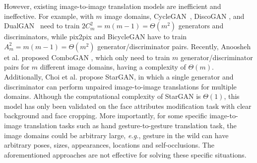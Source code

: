 \documentclass[sigconf]{acmart}
\begin{document}
However, existing image-to-image translation models are inefficient and ineffective.
For example, with $m$ image domains, CycleGAN~\cite{zhu2017unpaired}, DiscoGAN \cite{kim2017learning}, and DualGAN~\cite{yi2017dualgan} need to train $2C_m^2{=}m(m{-}1){=}\Theta(m^2)$ generators and discriminators, while pix2pix \cite{isola2017image} and BicycleGAN \cite{zhu2017toward} have to train $A_m^2{=}m(m{-}1){=}\Theta(m^2)$ generator/discriminator pairs.
Recently, Anoosheh et al. proposed ComboGAN \cite{anoosheh2017combogan}, which only need to train $m$ generator/discriminator pairs for $m$ different image domains, having a complexity of $\Theta(m)$.
Additionally, Choi et al. \cite{choi2017stargan} propose StarGAN, in which a single generator and discriminator can perform unpaired image-to-image translations for multiple domains.
Although the computational complexity of StarGAN is $\Theta(1)$, this model has only been validated on the face attributes modification task with clear background and face cropping.
More importantly, for some specific image-to-image translation tasks  such as hand gesture-to-gesture translation task, 
the image domains could be arbitrary large, \emph{e.g.}, gesture in the wild can have arbitrary poses, sizes, appearances, locations and self-occlusions.
The aforementioned approaches are not effective for solving these specific situations.
\end{document}
